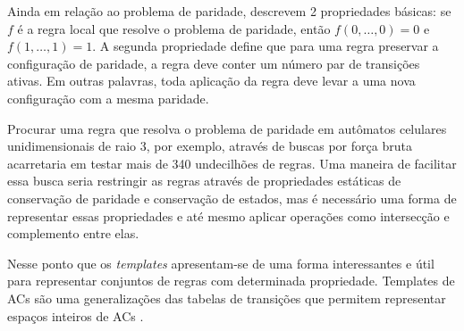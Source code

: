 Ainda em relação ao problema de paridade,  descrevem 2 propriedades básicas: se $f$ é a regra local que resolve o problema de paridade, então $f(0, \dots, 0) = 0$ e $f(1, \dots, 1) = 1$. A segunda propriedade define que para uma regra preservar a configuração de paridade, a regra deve conter um número par de transições ativas. Em outras palavras, toda aplicação da regra deve levar a uma nova configuração com a mesma paridade.

Procurar uma regra que resolva o problema de paridade em autômatos celulares unidimensionais de raio 3, por exemplo, através de buscas por força bruta acarretaria em testar mais de 340 undecilhões de regras. Uma maneira de facilitar essa busca seria restringir as regras através de propriedades estáticas de conservação de paridade e conservação de estados, mas é necessário uma forma de representar essas propriedades e até mesmo aplicar operações como intersecção e complemento entre elas.

Nesse ponto que os \textit{templates} apresentam-se de uma forma interessantes e útil para representar conjuntos de regras com determinada propriedade. Templates de ACs são uma generalizações das tabelas de transições que permitem representar espaços inteiros de ACs \cite{daCosta2014}.
